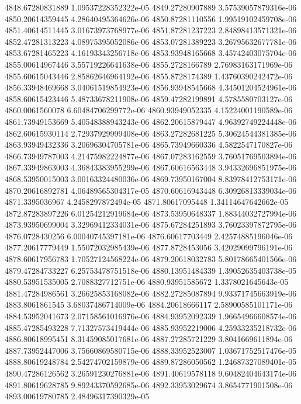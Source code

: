 {4848.67280831889 1.09537228352322e-05
4849.27280907889 3.57539057879316e-06
4850.20614359445 4.28640495364626e-06
4850.87281110556 1.99519102459708e-06
4851.40614511445 3.01673973768977e-06
4851.87281237223 2.84898413571321e-06
4852.47281313223 4.08975395052086e-06
4853.07281389223 3.26795632677781e-06
4853.67281465223 4.16193343256718e-06
4853.93948165668 3.45742403075704e-06
4855.00614967446 3.55719226641638e-06
4855.2728166789 2.76983163171969e-06
4855.60615043446 2.85862646964192e-06
4855.8728174389 1.43760390242472e-06
4856.33948469668 3.04061519854923e-06
4856.93948545668 4.34501204524961e-06
4858.60615423446 5.48733678211908e-06
4859.47282199891 4.5785580703127e-06
4860.0061560078 6.60484706299772e-06
4860.93949052335 4.15224001190589e-06
4861.73949153669 5.40548388943243e-06
4862.20615879447 4.96392749224448e-06
4862.60615930114 2.72937929999408e-06
4863.27282681225 5.30624544381385e-06
4863.93949432336 3.20696304705781e-06
4865.73949660336 4.5822547170827e-06
4866.73949787003 4.21475982224877e-06
4867.07283162559 3.76051769503894e-06
4867.33949863003 4.36843383955299e-06
4867.60616563448 3.94332696851975e-06
4868.53950015003 3.00163324480036e-06
4869.73950167004 8.83978412753171e-06
4870.20616892781 4.06489565304317e-05
4870.60616943448 6.30926813339034e-06
4871.3395036967 4.2458297872494e-05
4871.80617095448 1.34114647642662e-05
4872.87283897226 6.01254212919684e-06
4873.53950648337 1.88344032727994e-06
4873.93950699004 3.32969412334031e-06
4875.67284251893 3.76023397872795e-06
4876.0728430256 6.00040745397181e-06
4876.60617703449 2.42574885196046e-06
4877.20617779449 1.55072032985439e-06
4877.8728453056 3.42029099796191e-06
4878.60617956783 1.70527124568224e-06
4879.20618032783 5.80178665401566e-06
4879.47284733227 6.25753478751518e-06
4880.13951484339 1.39052635403738e-05
4880.53951535005 2.7088327712751e-06
4880.93951585672 1.3378021645643e-05
4881.47284986561 3.26625853168082e-06
4882.27285087894 9.93371745663919e-06
4883.8061861545 3.68037486714009e-06
4884.20618666117 2.58900585101171e-06
4884.53952041673 2.07158561016976e-06
4884.93952092339 1.96654966608574e-06
4885.47285493228 7.71327573419444e-06
4885.93952219006 4.25933235218732e-06
4886.80618995451 8.31459085017681e-06
4887.27285721229 3.8041669611894e-06
4887.73952447006 3.75660869580715e-06
4888.33952523007 1.03671752517476e-05
4888.80619248784 2.54274702159879e-06
4889.87286050562 1.24687327089401e-05
4890.47286126562 3.26591230276881e-06
4891.40619578118 9.60482404643174e-06
4891.80619628785 9.89243370592685e-06
4892.33953029674 3.8654771901508e-06
4893.00619780785 2.48496317390329e-05
}
